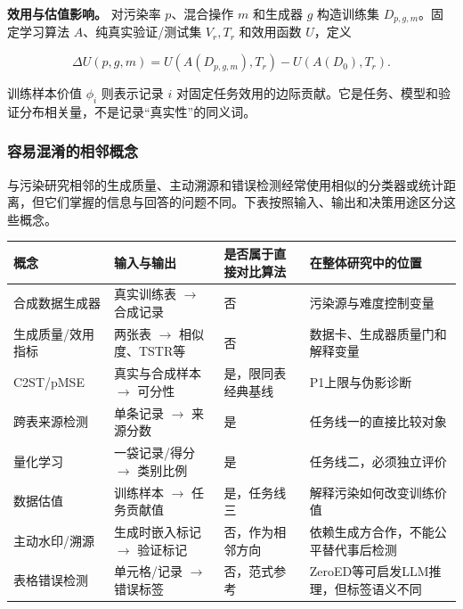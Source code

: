 \documentclass[
  chinese,
  12pt,
  a4paper,
  chinese,
  UTF8]{ctexart}
\begin{document}
\textbf{效用与估值影响。} 对污染率 \(p\)、混合操作 \(m\) 和生成器 \(g\)
构造训练集 \(D_{p,g,m}\)。固定学习算法 \(A\)、纯真实验证/测试集
\(V_r,T_r\) 和效用函数 \(U\)，定义

\[\Delta U(p,g,m)=U(A(D_{p,g,m}),T_r)-U(A(D_{0}),T_r).\]

训练样本价值 \(\phi_i\) 则表示记录 \(i\)
对固定任务效用的边际贡献。它是任务、模型和验证分布相关量，不是记录``真实性''的同义词。

\subsubsection{容易混淆的相邻概念}\label{ux5bb9ux6613ux6df7ux6dc6ux7684ux76f8ux90bbux6982ux5ff5}

与污染研究相邻的生成质量、主动溯源和错误检测经常使用相似的分类器或统计距离，但它们掌握的信息与回答的问题不同。下表按照输入、输出和决策用途区分这些概念。

\begin{longtable}[]{@{}
  >{\raggedright\arraybackslash}p{}
  >{\raggedright\arraybackslash}p{}
  >{\raggedleft\arraybackslash}p{}
  >{\raggedright\arraybackslash}p{}@{}}
\toprule\noalign{}
\begin{minipage}[b]{\linewidth}\raggedright
概念
\end{minipage} & \begin{minipage}[b]{\linewidth}\raggedright
输入与输出
\end{minipage} & \begin{minipage}[b]{\linewidth}\raggedleft
是否属于直接对比算法
\end{minipage} & \begin{minipage}[b]{\linewidth}\raggedright
在整体研究中的位置
\end{minipage} \\
\midrule\noalign{}
\endhead
\bottomrule\noalign{}
\endlastfoot
合成数据生成器 & 真实训练表 \(\rightarrow\) 合成记录 & 否 &
污染源与难度控制变量 \\
生成质量/效用指标 & 两张表 \(\rightarrow\) 相似度、TSTR等 & 否 &
数据卡、生成器质量门和解释变量 \\
C2ST/pMSE & 真实与合成样本 \(\rightarrow\) 可分性 & 是，限同表经典基线 &
P1上限与伪影诊断 \\
跨表来源检测 & 单条记录 \(\rightarrow\) 来源分数 & 是 &
任务线一的直接比较对象 \\
量化学习 & 一袋记录/得分 \(\rightarrow\) 类别比例 & 是 &
任务线二，必须独立评价 \\
数据估值 & 训练样本 \(\rightarrow\) 任务贡献值 & 是，任务线三 &
解释污染如何改变训练价值 \\
主动水印/溯源 & 生成时嵌入标记 \(\rightarrow\) 验证标记 &
否，作为相邻方向 & 依赖生成方合作，不能公平替代事后检测 \\
表格错误检测 & 单元格/记录 \(\rightarrow\) 错误标签 & 否，范式参考 &
ZeroED等可启发LLM推理，但标签语义不同 \\
\end{longtable}
\end{document}
